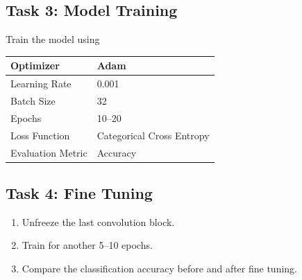 \documentclass[11pt]{article}
\begin{document}

\subsection*{Task 3: Model Training}

Train the model using

\begin{center}

\begin{tabular}{|p{5cm}|p{6cm}|}

\hline

Optimizer & Adam\\

\hline

Learning Rate & 0.001\\

\hline

Batch Size & 32\\

\hline

Epochs & 10--20\\

\hline

Loss Function &
Categorical Cross Entropy\\

\hline

Evaluation Metric &
Accuracy\\

\hline

\end{tabular}

\end{center}


\subsection*{Task 4: Fine Tuning}

\begin{enumerate}

\item Unfreeze the last convolution block.

\item Train for another 5--10 epochs.

\item Compare the classification accuracy before and after fine tuning.

\end{enumerate}
\end{document}

